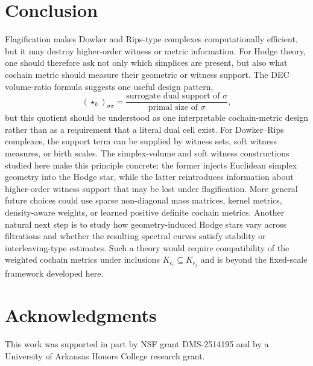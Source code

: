 \documentclass[11pt]{amsart}
\theoremstyle{plain}
\begin{document}
\section{Conclusion}
\label{sec:conclusion}

Flagification makes Dowker and Rips-type complexes computationally efficient, but it may destroy
higher-order witness or metric information. For Hodge theory, one should therefore ask not only
which simplices are present, but also what cochain metric should measure their geometric or witness
support. The DEC volume-ratio formula suggests one useful design pattern,
\[
(\star_k)_{\sigma\sigma}
=
\frac{\text{surrogate dual support of }\sigma}{\text{primal size of }\sigma},
\]
but this quotient should be understood as one interpretable cochain-metric design rather than as a
requirement that a literal dual cell exist. For Dowker--Rips complexes, the support term can be
supplied by witness sets, soft witness measures, or birth scales. The simplex-volume and soft
witness constructions studied here make this principle concrete: the former injects Euclidean
simplex geometry into the Hodge star, while the latter reintroduces information about higher-order
witness support that may be lost under flagification. More general future choices could use sparse
non-diagonal mass matrices, kernel metrics, density-aware weights, or learned positive definite
cochain metrics. Another natural next step is to study how geometry-induced Hodge stars vary across
filtrations and whether the resulting spectral curves satisfy stability or interleaving-type
estimates. Such a theory would require compatibility of the weighted cochain metrics under
inclusions $K_{\epsilon_i}\subseteq K_{\epsilon_j}$ and is beyond the fixed-scale framework
developed here.

\section*{Acknowledgments}
This work was supported in part by NSF grant DMS-2514195 and by a University of Arkansas Honors
College research grant.
\end{document}
